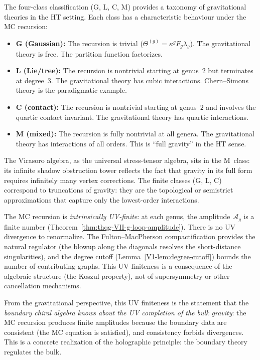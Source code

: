 \begin{remark}
The four-class classification (G, L, C, M) provides a taxonomy
of gravitational theories in the HT setting. Each class has a
characteristic behaviour under the MC recursion:
\begin{itemize}
\item \textbf{G (Gaussian):} The recursion is trivial
 ($\Theta^{(g)} = \kappa^g F_g \lambda_g$). The gravitational
 theory is free. The partition function factorizes.
\item \textbf{L (Lie/tree):} The recursion is nontrivial
 starting at genus~$2$ but terminates at degree~$3$. The
 gravitational theory has cubic interactions. Chern--Simons
 theory is the paradigmatic example.
\item \textbf{C (contact):} The recursion is nontrivial
 starting at genus~$2$ and involves the quartic contact
 invariant. The gravitational theory has quartic interactions.
\item \textbf{M (mixed):} The recursion is fully nontrivial
 at all genera. The gravitational theory has interactions of
 all orders. This is ``full gravity'' in the HT sense.
\end{itemize}
The Virasoro algebra, as the universal stress-tensor algebra,
sits in the M~class: its infinite shadow obstruction tower reflects the
fact that gravity in its full form requires infinitely many
vertex corrections. The finite classes (G, L, C) correspond
to truncations of gravity: they are the topological or
semistrict approximations that capture only the lowest-order
interactions.
\end{remark}

\begin{remark}
The MC recursion is \emph{intrinsically UV-finite}: at each
genus, the amplitude $\mathcal{A}_g$ is a finite number
(Theorem~\ref{thm:thqg-VII-g-loop-amplitude}). There is no
UV divergence to renormalize. The Fulton--MacPherson
compactification provides the natural regulator (the
blowup along the diagonals resolves the short-distance
singularities), and the degree cutoff
(Lemma~\ref{V1-lem:degree-cutoff}) bounds the number of
contributing graphs. This UV finiteness is a consequence
of the algebraic structure (the Koszul property), not of
supersymmetry or other cancellation mechanisms.

From the gravitational perspective, this UV finiteness is the
statement that the \emph{boundary chiral algebra knows about
the UV completion of the bulk gravity}: the MC recursion
produces finite amplitudes because the boundary data are
consistent (the MC equation is satisfied), and consistency
forbids divergences. This is a concrete realization of the
holographic principle: the boundary theory regulates the bulk.
\end{remark}

